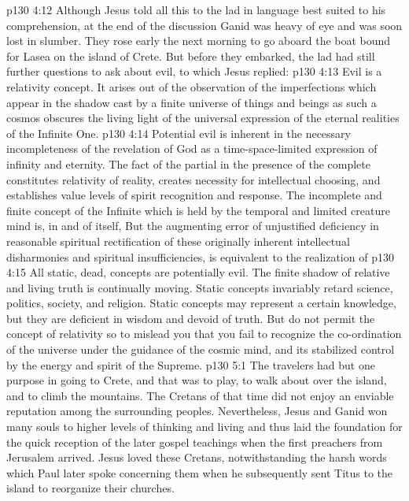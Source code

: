 \pc \vs p130 4:12 Although Jesus told all this to the lad in language best suited to his comprehension, at the end of the discussion Ganid was heavy of eye and was soon lost in slumber. They rose early the next morning to go aboard the boat bound for Lasea on the island of Crete. But before they embarked, the lad had still further questions to ask about evil, to which Jesus replied:
\pc \vs p130 4:13 Evil is a relativity concept. It arises out of the observation of the imperfections which appear in the shadow cast by a finite universe of things and beings as such a cosmos obscures the living light of the universal expression of the eternal realities of the Infinite One.
\vs p130 4:14 Potential evil is inherent in the necessary incompleteness of the revelation of God as a time\hyp{}space\hyp{}limited expression of infinity and eternity. The fact of the partial in the presence of the complete constitutes relativity of reality, creates necessity for intellectual choosing, and establishes value levels of spirit recognition and response. The incomplete and finite concept of the Infinite which is held by the temporal and limited creature mind is, in and of itself,  But the augmenting error of unjustified deficiency in reasonable spiritual rectification of these originally inherent intellectual disharmonies and spiritual insufficiencies, is equivalent to the realization of 
\vs p130 4:15 All static, dead, concepts are potentially evil. The finite shadow of relative and living truth is continually moving. Static concepts invariably retard science, politics, society, and religion. Static concepts may represent a certain knowledge, but they are deficient in wisdom and devoid of truth. But do not permit the concept of relativity so to mislead you that you fail to recognize the co\hyp{}ordination of the universe under the guidance of the cosmic mind, and its stabilized control by the energy and spirit of the Supreme.
\vs p130 5:1 The travelers had but one purpose in going to Crete, and that was to play, to walk about over the island, and to climb the mountains. The Cretans of that time did not enjoy an enviable reputation among the surrounding peoples. Nevertheless, Jesus and Ganid won many souls to higher levels of thinking and living and thus laid the foundation for the quick reception of the later gospel teachings when the first preachers from Jerusalem arrived. Jesus loved these Cretans, notwithstanding the harsh words which Paul later spoke concerning them when he subsequently sent Titus to the island to reorganize their churches.
